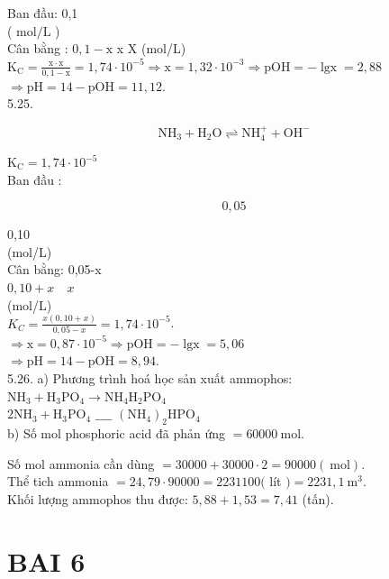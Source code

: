 \documentclass[10pt]{article}
\begin{document}
Ban đầu: 0,1\\
( $\mathrm{mol} / \mathrm{L}$ )\\
Cân bằng : $0,1-\mathrm{x}$ x X (mol/L)\\
$\mathrm{K}_{\mathrm{C}}=\frac{\mathrm{x} \cdot \mathrm{x}}{0,1-\mathrm{x}}=1,74 \cdot 10^{-5} \Rightarrow \mathrm{x}=1,32 \cdot 10^{-3} \Rightarrow \mathrm{pOH}=-\operatorname{lgx}=2,88$\\
$\Rightarrow \mathrm{pH}=14-\mathrm{pOH}=11,12$.\\
5.25.

$$
\mathrm{NH}_{3}+\mathrm{H}_{2} \mathrm{O} \rightleftharpoons \mathrm{NH}_{4}^{+}+\mathrm{OH}^{-}
$$

$\mathrm{K}_{\mathrm{C}}=1,74 \cdot 10^{-5}$\\
Ban đầu :

$$
0,05
$$

0,10\\
(mol/L)\\
Cân bằng: 0,05-x\\
$0,10+x \quad x$\\
(mol/L)\\
$K_{C}=\frac{x(0,10+x)}{0,05-x}=1,74 \cdot 10^{-5}$.\\
$\Rightarrow \mathrm{x}=0,87 \cdot 10^{-5} \Rightarrow \mathrm{pOH}=-\operatorname{lgx}=5,06$\\
$\Rightarrow \mathrm{pH}=14-\mathrm{pOH}=8,94$.\\
5.26. a) Phương trình hoá học sản xuất ammophos:\\
$\mathrm{NH}_{3}+\mathrm{H}_{3} \mathrm{PO}_{4} \longrightarrow \mathrm{NH}_{4} \mathrm{H}_{2} \mathrm{PO}_{4}$\\
$2 \mathrm{NH}_{3}+\mathrm{H}_{3} \mathrm{PO}_{4}$ $\_\_\_\_$ $\left(\mathrm{NH}_{4}\right)_{2} \mathrm{HPO}_{4}$\\
b) Số mol phosphoric acid đã phản ứng $=60000 \mathrm{~mol}$.

Số mol ammonia cần dùng $=30000+30000 \cdot 2=90000(\mathrm{~mol})$.\\
Thể tich ammonia $=24,79 \cdot 90000=2231100($ lít $)=2231,1 \mathrm{~m}^{3}$.\\
Khối lượng ammophos thu được: $5,88+1,53=7,41$ (tấn).

\section*{BAI 6}
\end{document}
